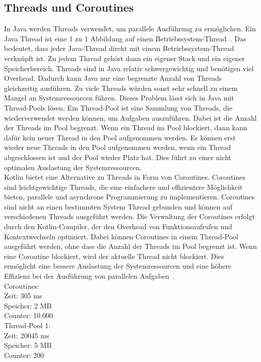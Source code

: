 \documentclass[11pt]{article}
\begin{document}
    \subsection{Threads und Coroutines}
    In Java werden Threads verwendet, um parallele Ausführung zu ermöglichen.
    Ein Java Thread ist eine 1 zu 1 Abbildung auf einen Betriebssystem-Thread~\cite[940]{insel}.
    Das bedeutet, dass jeder Java-Thread direkt mit einem Betriebssystem-Thread verknüpft ist.
    Zu jedem Thread gehört dann ein eigener Stack und ein eigener Speicherbereich.
    Threads sind in Java relativ schwergewichtig und benötigen viel Overhead.
    Dadurch kann Java nur eine begrenzte Anzahl von Threads gleichzeitig ausführen.
    Zu viele Threads würden sonst sehr schnell zu einem Mangel an Systemressourcen führen.
    Dieses Problem lässt sich in Java mit Thread-Pools lösen.
    Ein Thread-Pool ist eine Sammlung von Threads, die wiederverwendet werden können, um Aufgaben auszuführen.
    Dabei ist die Anzahl der Threads im Pool begrenzt.
    Wenn ein Thread im Pool blockiert, dann kann dafür kein neuer Thread in den Pool aufgenommen werden.
    Es können erst wieder neue Threads in den Pool aufgenommen werden, wenn ein Thread abgeschlossen ist und der Pool wieder Platz hat.
    Dies führt zu einer nicht optimalen Auslastung der Systemressourcen.\\
    Kotlin bietet eine Alternative zu Threads in Form von Coroutines.
    Coroutines sind leichtgewichtige Threads, die eine einfachere und effizientere Möglichkeit bieten, parallele und asynchrone Programmierung zu implementieren.
    Coroutines sind nicht an einen bestimmten System Thread gebunden und können auf verschiedenen Threads ausgeführt werden.
    Die Verwaltung der Coroutines erfolgt durch den Kotlin-Compiler, der den Overhead von Funktionsaufrufen und Kontextwechseln optimiert.
    Dabei können Coroutines in einem Thread-Pool ausgeführt werden, ohne dass die Anzahl der Threads im Pool begrenzt ist.
    Wenn eine Coroutine blockiert, wird der aktuelle Thread nicht blockiert.
    Dies ermöglicht eine bessere Auslastung der Systemressourcen und eine höhere Effizienz bei der Ausführung von parallelen Aufgaben~\cite[194]{kotlin-patterns}.
    \\
    Coroutines:\\
    Zeit: 305 ms\\
    Speicher: 2 MB\\
    Counter: 10.000\\

    Thread-Pool 1:\\
    Zeit: 20045 ms\\
    Speicher: 5 MB\\
    Counter: 200\\
\end{document}
